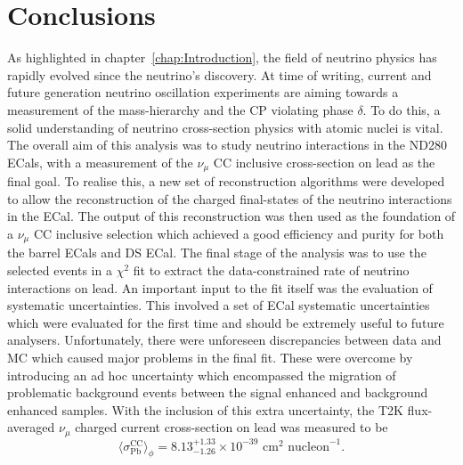 \section{Conclusions}
\label{sec:Conclusions}
As highlighted in chapter~\ref{chap:Introduction}, the field of neutrino physics has rapidly evolved since the neutrino's discovery.  At time of writing, current and future generation neutrino oscillation experiments are aiming towards a measurement of the mass-hierarchy and the CP violating phase $\delta$.  To do this, a solid understanding of neutrino cross-section physics with atomic nuclei is vital. 
\newline
\newline
The overall aim of this analysis was to study neutrino interactions in the ND280 ECals, with a measurement of the $\nu_\mu$ CC inclusive cross-section on lead as the final goal.  To realise this, a new set of reconstruction algorithms were developed to allow the reconstruction of the charged final-states of the neutrino interactions in the ECal.  The output of this reconstruction was then used as the foundation of a $\nu_\mu$ CC inclusive selection which achieved a good efficiency and purity for both the barrel ECals and DS ECal.  The final stage of the analysis was to use the selected events in a $\chi^2$ fit to extract the data-constrained rate of neutrino interactions on lead.  An important input to the fit itself was the evaluation of systematic uncertainties.  This involved a set of ECal systematic uncertainties which were evaluated for the first time and should be extremely useful to future analysers.
\newline
\newline
Unfortunately, there were unforeseen discrepancies between data and MC which caused major problems in the final fit.  These were overcome by introducing an ad hoc uncertainty which encompassed the migration of problematic background events between the signal enhanced and background enhanced samples.  With the inclusion of this extra uncertainty, the T2K flux-averaged $\nu_\mu$ charged current cross-section on lead was measured to be 
\begin{equation}
\langle \sigma^{\textrm{CC}}_{\textrm{Pb}} \rangle_{\phi} = 8.13^{+1.33}_{-1.26} \times 10^{-39} \textrm{ cm}^2 \textrm{ nucleon}^{-1}.
\end{equation}

